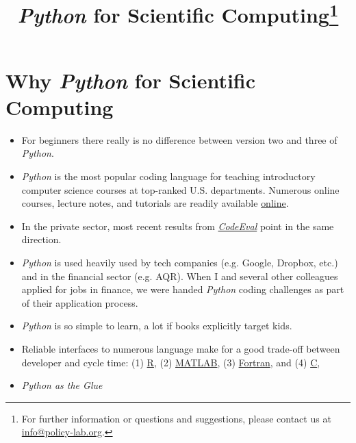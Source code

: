 
\title{\textit{Python} for Scientific Computing\thanks{For further information or questions and suggestions, please contact us at \href{mailto: info@policy-lab.org}{info@policy-lab.org}.}}
\author{ }
\date{ } 


\section{Why \textit{Python} for Scientific Computing}

\begin{itemize}
\item For beginners there really is no difference between version two and three of \textit{Python}.
\item \textit{Python} is the most popular coding language for teaching introductory computer science courses at top-ranked U.S. departments. Numerous online courses, lecture notes, and tutorials are readily available \href{http://www.fullstackpython.com/best-python-resources.html}{online}.
\item In the private sector, most recent results from \href{https://www.codeeval.com}{\textit{CodeEval}} point in the same direction.
\item \textit{Python} is used heavily used by tech companies (e.g. Google, Dropbox, etc.) and in the financial sector (e.g. AQR). When I and several other colleagues applied for jobs in finance, we were handed \textit{Python} coding challenges as part of their application process.
\item \textit{Python} is so simple to learn, a lot if books explicitly target kids. 
\item Reliable interfaces to numerous language make for a good trade-off between developer and cycle time: (1) \href{https://www.r-project.org}{R}, (2) \href{www.mathworks.com}{MATLAB}, (3) \href{https://en.wikipedia.org/wiki/Fortran}{Fortran}, and (4) \href{ttps://en.wikipedia.org/wiki/C_(programming_language}{C},
\item \textit{Python as the Glue}
\end{itemize}

